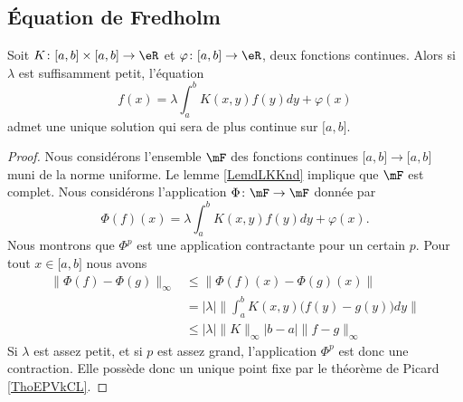 
\subsection{Équation de Fredholm}

\begin{theorem}     \label{ThoagJPZJ}
    Soit \( K\colon \mathopen[ a , b \mathclose]\times \mathopen[ a , b \mathclose]\to \eR\) et \( \varphi\colon \mathopen[ a , b \mathclose]\to \eR\), deux fonctions continues. Alors si \( \lambda\) est suffisamment petit, l'équation
    \begin{equation}
        f(x)=\lambda\int_a^bK(x,y)f(y)dy+\varphi(x)
    \end{equation}
    admet une unique solution qui sera de plus continue sur \( \mathopen[ a , b \mathclose]\).
\end{theorem}

\begin{proof}
    Nous considérons l'ensemble \( \mF\) des fonctions continues \( \mathopen[ a , b \mathclose]\to\mathopen[ a , b \mathclose]\) muni de la norme uniforme. Le lemme \ref{LemdLKKnd} implique que \( \mF\) est complet. Nous considérons l'application \( \Phi\colon \mF\to \mF\) donnée par
    \begin{equation}
        \Phi(f)(x)=\lambda\int_a^bK(x,y)f(y)dy+\varphi(x). 
    \end{equation}
    Nous montrons que \( \Phi^p\) est une application contractante pour un certain \( p\). Pour tout \( x\in \mathopen[ a , b \mathclose]\) nous avons
    \begin{subequations}
        \begin{align}
            \| \Phi(f)-\Phi(g) \|_{\infty}&\leq \| \Phi(f)(x)-\Phi(g)(x) \|\\
            &=| \lambda |\Big\| \int_a^bK(x,y)\big( f(y)-g(y) \big)dy  \Big\|\\
            &\leq | \lambda |\| K \|_{\infty}| b-a |\| f-g \|_{\infty}
        \end{align}
    \end{subequations}
    Si \( \lambda\) est assez petit, et si \( p\) est assez grand, l'application \( \Phi^p\) est donc une contraction. Elle possède donc un unique point fixe par le théorème de Picard \ref{ThoEPVkCL}.
\end{proof}

